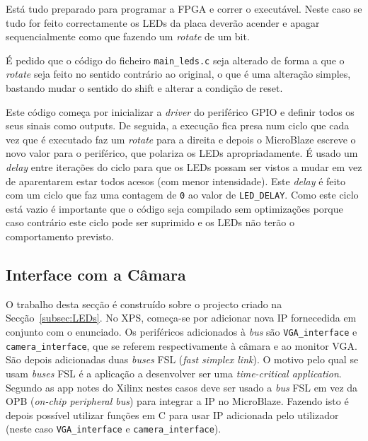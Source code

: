 \documentclass[a4paper,12pt]{article}
\begin{document}
Está tudo preparado para programar a FPGA e correr o executável. Neste caso se tudo for feito correctamente os LEDs da placa deverão acender e apagar sequencialmente como que fazendo um \textit{rotate} de um bit.

%

É pedido que o código do ficheiro \texttt{main\_leds.c} seja alterado de forma a que o \textit{rotate} seja feito no sentido contrário ao original, o que é uma alteração simples, bastando mudar o sentido do shift e alterar a condição de reset.  %

Este código começa por inicializar a \textit{driver} do periférico GPIO e definir todos os seus sinais como outputs. De seguida, a execução fica presa num ciclo que cada vez que é executado faz um \textit{rotate} para a direita e depois o MicroBlaze escreve o novo valor para o periférico, que polariza os LEDs apropriadamente. É usado um \textit{delay} entre iterações do ciclo para que os LEDs possam ser vistos a mudar em vez de aparentarem estar todos acesos (com menor intensidade). Este \textit{delay} é feito com um ciclo que faz uma contagem de \texttt{0} ao valor de \texttt{LED\_DELAY}. Como este ciclo está vazio é importante que o código seja compilado sem optimizações porque caso contrário este ciclo pode ser suprimido e os LEDs não terão o comportamento previsto.

\subsection{Interface com a Câmara}

O trabalho desta secção é construído sobre o projecto criado na Secção~\ref{subsec:LEDs}. No XPS, começa-se por adicionar nova IP fornecedida em conjunto com o enunciado. Os periféricos adicionados à \textit{bus} são \texttt{VGA\_interface} e \texttt{camera\_interface}, que se referem respectivamente à câmara e ao monitor VGA. São depois adicionadas duas \textit{buses} FSL (\textit{fast simplex link}). O motivo pelo qual se usam \textit{buses} FSL é a aplicação a desenvolver ser uma \textit{time-critical application}. Segundo as app notes do Xilinx nestes casos deve ser usado a \textit{bus} FSL em vez da OPB (\textit{on-chip peripheral bus}) para integrar a IP no MicroBlaze. Fazendo isto é depois possível utilizar funções em C para usar IP adicionada pelo utilizador (neste caso \texttt{VGA\_interface} e \texttt{camera\_interface}).
\end{document}
